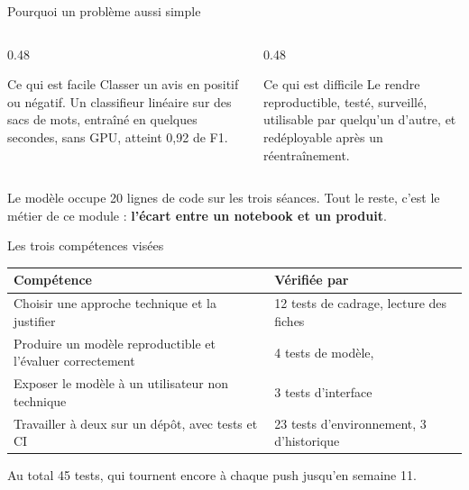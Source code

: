 \documentclass[aspectratio=169,11pt]{beamer}
\newcommand{\co}[1]{\texttt{\detokenize{#1}}}
\begin{document}
\begin{frame}{Pourquoi un problème aussi simple}
\begin{columns}[T,onlytextwidth]
\begin{column}{0.48\textwidth}
  \begin{block}{Ce qui est facile}
  \small Classer un avis en positif ou négatif. Un classifieur linéaire sur des sacs de mots,
  entraîné en quelques secondes, sans GPU, atteint 0,92 de F1.
  \end{block}
\end{column}
\begin{column}{0.48\textwidth}
  \begin{alertblock}{Ce qui est difficile}
  \small Le rendre reproductible, testé, surveillé, utilisable par quelqu'un d'autre, et
  redéployable après un réentraînement.
  \end{alertblock}
\end{column}
\end{columns}
\vspace{6pt}
\centering\small
Le modèle occupe 20 lignes de code sur les trois séances. Tout le reste, c'est le métier
de ce module : \textbf{l'écart entre un notebook et un produit}.
\end{frame}

\begin{frame}{Les trois compétences visées}
\begin{center}
\begin{tabular}{@{}p{7.8cm}p{6.0cm}@{}}
\toprule
\textbf{Compétence} & \textbf{Vérifiée par} \\
\midrule
Choisir une approche technique et la justifier & 12 tests de cadrage, lecture des fiches \\
Produire un modèle reproductible et l'évaluer correctement & 4 tests de modèle, \co{metrics.json} \\
Exposer le modèle à un utilisateur non technique & 3 tests d'interface \\
Travailler à deux sur un dépôt, avec tests et CI & 23 tests d'environnement, 3 d'historique \\
\bottomrule
\end{tabular}
\end{center}
\vspace{5pt}
\centering\small Au total 45 tests, qui tournent encore à chaque push jusqu'en semaine 11.
\end{frame}

\end{document}

